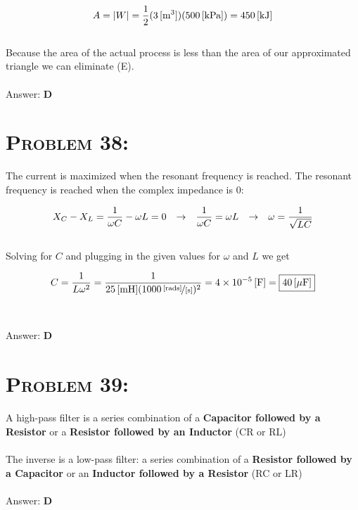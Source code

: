 \documentclass{article}
\providecommand{\e}[1]{\ensuremath{\times 10^{#1}}}
\begin{document}
\begin{gather}
A = |W| = \frac{1}{2} (\unit[3]{[m^{3}]}) (\unit[500]{[kPa]}) = \unit[450]{[kJ]}
\end{gather}
\\
Because the area of the actual process is less than the area of our approximated triangle we can eliminate (E).
\\\\
Answer: \textbf{\textcolor{ProcessBlue}D}\\


\section{\textsc{Problem 38:}} The current is maximized when the resonant frequency is reached. The resonant frequency is reached when the complex impedance is 0:

\begin{gather}
X_{C} - X_{L} = \frac{1}{\omega C} - \omega L = 0 \hspace{.1in} \rightarrow \hspace{.1in} \frac{1}{\omega C} = \omega L \hspace{.1in} \rightarrow \hspace{.1in} \omega = \frac{1}{\sqrt{LC}}
\end{gather}
\\
Solving for $C$ and plugging in the given values for $\omega$ and $L$ we get

\begin{gather}
C = \frac{1}{L \omega^{2}} =  \frac{1}{\unit[25]{[mH]} (\unitfrac[1000]{[rads]}{[s]})^{2}}  = \unit[4\e{-5}]{[F]} = \boxed{\unit[40]{[\mu F]}} \nonumber
\end{gather}
\\\\
Answer: \textbf{\textcolor{ProcessBlue}D}\\


\section{\textsc{Problem 39:}} A high-pass filter is a series combination of a \textbf{Capacitor followed by a Resistor} or a \textbf{Resistor followed by an Inductor} (CR or RL)\\
\\
The inverse is a low-pass filter: a  series combination of a \textbf{Resistor followed by a Capacitor} or an \textbf{Inductor followed by a Resistor} (RC or LR)
\\\\
Answer: \textbf{\textcolor{ProcessBlue}D}\\
\end{document}
